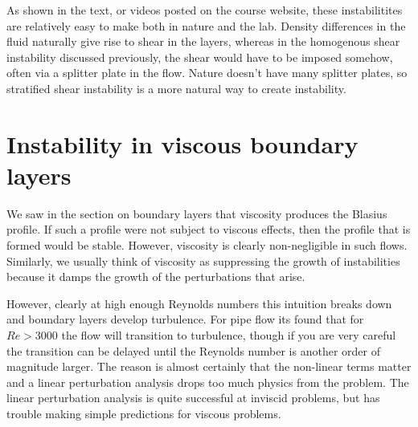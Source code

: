 \documentclass[11pt]{article}
\begin{document}
As shown in the text, or videos posted on the course website, these instabilitites are relatively easy to make both in nature and the lab.  Density differences in the fluid naturally give rise to shear in the layers, whereas in the homogenous shear instability discussed previously, the shear would have to be imposed somehow, often via a splitter plate in the flow.  Nature doesn't have many splitter plates, so stratified shear instability is a more natural way to create instability.  

\section{Instability in viscous boundary layers}

We saw in the section on boundary layers that viscosity produces the Blasius profile.  If such a profile were not subject to viscous effects, then the profile that is formed would be stable.  However, viscosity is clearly non-negligible in such flows.  Similarly, we usually think of viscosity as suppressing the growth of instabilities because it damps the growth of the perturbations that arise.

However, clearly at high enough Reynolds numbers this intuition breaks down and boundary layers develop turbulence.  For pipe flow its found that for $Re>3000$ the flow will transition to turbulence, though if you are very careful the transition can be delayed until the Reynolds number is another order of magnitude larger.  The reason is almost certainly that the non-linear terms matter and a linear perturbation analysis drops too much physics from the problem.   The linear perturbation analysis is quite successful at inviscid problems, but has trouble making simple predictions for viscous problems. 
\end{document}
